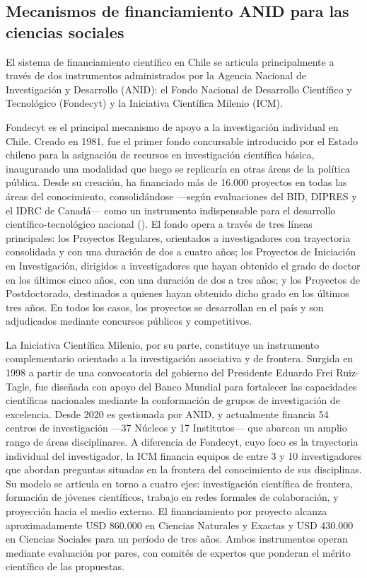 \documentclass[
  12pt,
  letterpaper,
]{article}
\begin{document}
\subsection{Mecanismos de financiamiento ANID para las ciencias
sociales}\label{mecanismos-de-financiamiento-anid-para-las-ciencias-sociales}

El sistema de financiamiento científico en Chile se articula
principalmente a través de dos instrumentos administrados por la Agencia
Nacional de Investigación y Desarrollo (ANID): el Fondo Nacional de
Desarrollo Científico y Tecnológico (Fondecyt) y la Iniciativa
Científica Milenio (ICM).

Fondecyt es el principal mecanismo de apoyo a la investigación
individual en Chile. Creado en 1981, fue el primer fondo concursable
introducido por el Estado chileno para la asignación de recursos en
investigación científica básica, inaugurando una modalidad que luego se
replicaría en otras áreas de la política pública. Desde su creación, ha
financiado más de 16.000 proyectos en todas las áreas del conocimiento,
consolidándose ---según evaluaciones del BID, DIPRES y el IDRC de
Canadá--- como un instrumento indispensable para el desarrollo
científico-tecnológico nacional
(). El fondo
opera a través de tres líneas principales: los Proyectos Regulares,
orientados a investigadores con trayectoria consolidada y con una
duración de dos a cuatro años; los Proyectos de Iniciación en
Investigación, dirigidos a investigadores que hayan obtenido el grado de
doctor en los últimos cinco años, con una duración de dos a tres años; y
los Proyectos de Postdoctorado, destinados a quienes hayan obtenido
dicho grado en los últimos tres años. En todos los casos, los proyectos
se desarrollan en el país y son adjudicados mediante concursos públicos
y competitivos.

La Iniciativa Científica Milenio, por su parte, constituye un
instrumento complementario orientado a la investigación asociativa y de
frontera. Surgida en 1998 a partir de una convocatoria del gobierno del
Presidente Eduardo Frei Ruiz-Tagle, fue diseñada con apoyo del Banco
Mundial para fortalecer las capacidades científicas nacionales mediante
la conformación de grupos de investigación de excelencia. Desde 2020 es
gestionada por ANID, y actualmente financia 54 centros de investigación
---37 Núcleos y 17 Institutos--- que abarcan un amplio rango de áreas
disciplinares. A diferencia de Fondecyt, cuyo foco es la trayectoria
individual del investigador, la ICM financia equipos de entre 3 y 10
investigadores que abordan preguntas situadas en la frontera del
conocimiento de sus disciplinas. Su modelo se articula en torno a cuatro
ejes: investigación científica de frontera, formación de jóvenes
científicos, trabajo en redes formales de colaboración, y proyección
hacia el medio externo. El financiamiento por proyecto alcanza
aproximadamente USD 860.000 en Ciencias Naturales y Exactas y USD
430.000 en Ciencias Sociales para un período de tres años. Ambos
instrumentos operan mediante evaluación por pares, con comités de
expertos que ponderan el mérito científico de las propuestas.
\end{document}

